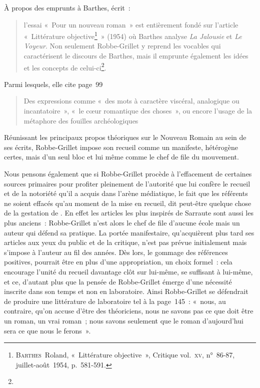 À propos des emprunts à Barthes, \galia{} écrit~:
\begin{quote}
l’essai «~Pour un nouveau roman~» est entièrement fondé sur l’article «~Littérature objective\footnote{\textsc{Barthes}~Roland, «~Littérature objective~», Critique vol.~\textsc{xv}, n°~86-87, juillet-août~1954, p.~581-591.}~» (1954) où Barthes analyse \textit{La Jalousie} et \textit{Le Voyeur}. Non seulement Robbe-Grillet y reprend les vocables qui caractérisent le discours de Barthes, mais il emprunte également les idées et les concepts de celui-ci\footnote{}.    
\end{quote}
Parmi lesquels, elle cite page~99
\begin{quote}
Des expressions comme «~des mots à caractère viscéral, analogique ou incantatoire~», «~le cœur romantique des choses~», ou encore l’usage de la métaphore des fouilles archéologiques
\end{quote}

Réunissant les principaux propos théoriques sur le Nouveau Romain au sein de ses écrits, Robbe-Grillet impose son recueil comme un manifeste, hétérogène certes, mais d'un seul bloc et lui même comme le chef de file du mouvement.


Nous pensons également que si Robbe-Grillet procède à l'effacement de certaines sources primaires pour profiter pleinement de l'autorité que lui confère le recueil et de la notoriété qu'il a acquis dans l'arène médiatique, le fait que les référents ne soient effacés qu'au moment de la mise en recueil, dit peut-être quelque chose de la gestation de \punr. En effet les articles les plus inspirés de Sarraute sont aussi les plus anciens~: Robbe-Grillet n'est alors le chef de file d'aucune école mais un auteur qui défend sa pratique. La portée manifestaire, qu'acquièrent plus tard ses articles aux yeux du public et de la critique, n'est pas prévue initialement mais s'impose à l'auteur au fil des années. Dès lors, le gommage des références positives, pourrait être en plus d'une appropriation, un choix formel~: cela encourage l'unité du recueil davantage clôt sur lui-même, se suffisant à lui-même, et ce, d'autant plus que la pensée de Robbe-Grillet émerge d'une nécessité inscrite dans son temps et non en laboratoire. Ainsi Robbe-Grillet se défendrait de produire une littérature de laboratoire tel à la page~145~: «~nous, au contraire, qu’on accuse d’être des théoriciens, nous ne savons pas ce que doit être un roman, un vrai roman~; nous savons seulement que le roman d’aujourd’hui sera ce que nous le ferons~».



